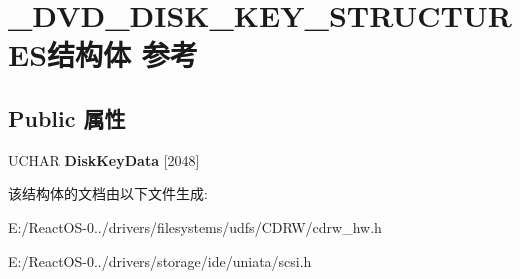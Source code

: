 \hypertarget{struct___d_v_d___d_i_s_k___k_e_y___s_t_r_u_c_t_u_r_e_s}{}\section{\+\_\+\+D\+V\+D\+\_\+\+D\+I\+S\+K\+\_\+\+K\+E\+Y\+\_\+\+S\+T\+R\+U\+C\+T\+U\+R\+E\+S结构体 参考}
\label{struct___d_v_d___d_i_s_k___k_e_y___s_t_r_u_c_t_u_r_e_s}
\subsection*{Public 属性}
\begin{DoxyCompactItemize}
\item 
\mbox{\label{struct___d_v_d___d_i_s_k___k_e_y___s_t_r_u_c_t_u_r_e_s_a5bb541079eb4c6b28f7e3f0276fc99b6}} 
U\+C\+H\+AR {\bfseries Disk\+Key\+Data} \mbox{[}2048\mbox{]}
\end{DoxyCompactItemize}


该结构体的文档由以下文件生成\+:\begin{DoxyCompactItemize}
\item 
E\+:/\+React\+O\+S-\/0../drivers/filesystems/udfs/\+C\+D\+R\+W/cdrw\+\_\+hw.\+h\item 
E\+:/\+React\+O\+S-\/0../drivers/storage/ide/uniata/scsi.\+h\end{DoxyCompactItemize}
